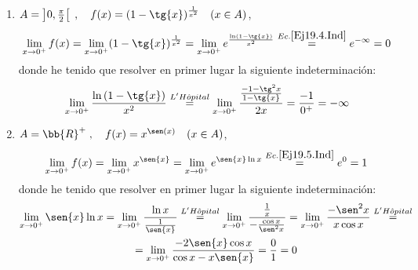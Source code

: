 \begin{ejercicio}
\begin{enumerate}
        \item $A = \left] 0, \frac{\pi}{2}\right[\;,\quad f(x)=(1-\tg{x})^\frac{1}{x^2}\quad (x\in A)$,
        \begin{equation*}
            \lim_{x\to 0^+}f(x)
            = \lim_{x\to 0^+} (1-\tg{x})^\frac{1}{x^2}
            = \lim_{x\to 0^+} e^{\frac{\ln\left(1-\tg{x}\right)}{x^2}}
            \stackrel{Ec. \ref{Ej19.4.Ind}}{=} e^{-\infty} = 0
        \end{equation*}
        donde he tenido que resolver en primer lugar la siguiente indeterminación:
        \begin{equation}\label{Ej19.4.Ind}
            \lim_{x\to 0^+}\frac{\ln\left(1-\tg{x}\right)}{x^2}
            \stackrel{L'H\hat{o}pital}{=}
            \lim_{x\to 0^+} \frac{\frac{-1-\tg^2{x}}{1-\tg{x}}}{2x} = \frac{-1}{0^+} = -\infty 
        \end{equation}

        \item $A = \bb{R}^+\;,\quad f(x)=x^{\sen(x)}\quad (x\in A)$,
        \begin{equation*}
            \lim_{x\to 0^+}f(x)
            = \lim_{x\to 0^+} x^{\sen{x}}
            = \lim_{x\to 0^+} e^{\sen{x}\ln{x}}
            \stackrel{Ec. \ref{Ej19.5.Ind}}{=} e^0=1
        \end{equation*}
        donde he tenido que resolver en primer lugar la siguiente indeterminación:
        \begin{multline}\label{Ej19.5.Ind}
            \lim_{x\to 0^+}\sen{x}\ln{x}
            = \lim_{x\to 0^+}\frac{\ln{x}}{\frac{1}{\sen{x}}}
            \stackrel{L'H\hat{o}pital}{=}
            \lim_{x\to 0^+} \frac{\frac{1}{x}}{-\frac{\cos{x}}{\sen^2{x}}}
            = \lim_{x\to 0^+} \frac{-\sen^2{x}}{x\cos{x}}
            \stackrel{L'H\hat{o}pital}{=}\\=
            \lim_{x\to 0^+} \frac{-2\sen{x}\cos{x}}{\cos{x}-x\sen{x}} = \frac{0}{1} = 0
        \end{multline}
        
    \end{enumerate}
\end{ejercicio}

